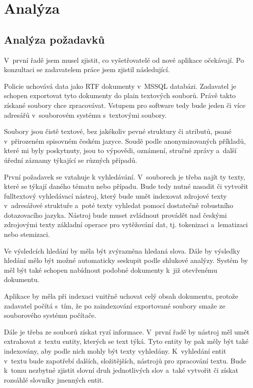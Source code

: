 \chapter{Analýza}
\label{analysis}
\section{Analýza požadavků}
V~první řadě jsem musel zjistit, co vyšetřovatelé od nové aplikace očekávají. Po konzultaci se zadavatelem práce jsem zjistil následující. 

Policie uchovává data jako RTF dokumenty v~MSSQL databázi. Zadavatel je schopen exportovat tyto dokumenty do plain textových souborů. Právě takto získané soubory chce zpracovávat. Vstupem pro software tedy bude jeden či více adresářů v~souborovém systému s~textovými soubory.

Soubory jsou čistě textové, bez jakékoliv pevné struktury či atributů, psané v~přirozeném spisovném českém jazyce. Soudě podle anonymizovaných příkladů, které mi byly poskytnuty, jsou to výpovědi, oznámení, stručné zprávy a~další úřední záznamy týkající se různých případů.

První požadavek se vztahuje k vyhledávání. V~souborech je třeba najít ty texty, které se týkají daného tématu nebo případu. Bude tedy nutné nasadit či vytvořit fulltextový vyhledávací nástroj, který bude umět indexovat zdrojové texty v~adresářové struktuře a~poté texty vyhledat pomocí dostatečně robustního dotazovacího jazyka. Nástroj bude muset zvládnout provádět nad českými zdrojovými texty základní operace pro vytěžování dat, tj. tokenizaci a~lematizaci nebo stemizaci.

Ve výsledcích hledání by měla být zvýrazněna hledaná slova. Dále by výsledky hledání mělo být možné automaticky seskupit podle shlukové analýzy. Systém by měl být také schopen nabídnout podobné dokumenty k~již otevřenému dokumentu.

Aplikace by měla při indexaci vnitřně uchovat celý obsah dokumentu, protože zadavatel počítá s~tím, že po zaindexování exportované soubory smaže ze souborového systému počítače.

Dále je třeba ze souborů získat ryzí informace. V~první řadě by nástroj měl umět extrahovat z~textu entity, kterých se text týká. Tyto entity by pak měly být také indexovány, aby podle nich mohly být texty vyhledány. K~vyhledání entit v~textu bude zapotřebí dalších, složitějších, nástrojů pro zpracování textu. Bude k~tomu nezbytné zjistit slovní druh jednotlivých slov a~také vytvořit či získat rozsáhlé slovníky jmenných entit. 

